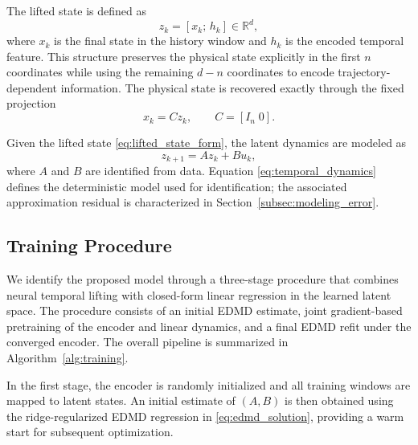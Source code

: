 \documentclass[journal]{IEEEtran}
\begin{document}
The lifted state is defined as
\begin{equation}
    z_k = [x_k;\,h_k] \in \mathbb{R}^{d},
    \label{eq:lifted_state_form}
\end{equation}
where $x_k$ is the final state in the history window and $h_k$ is the encoded temporal feature. This structure preserves the physical state explicitly in the first $n$ coordinates while using the remaining $d-n$ coordinates to encode trajectory-dependent information. The physical state is recovered exactly through the fixed projection
\begin{equation}
    x_k = C z_k, \qquad C = [I_n\;0].
    \label{eq:decoder_projection}
\end{equation}

Given the lifted state \eqref{eq:lifted_state_form}, the latent dynamics are modeled as
\begin{equation}
    z_{k+1} = A z_k + B u_k,
    \label{eq:temporal_dynamics}
\end{equation}
where $A$ and $B$ are identified from data. Equation \eqref{eq:temporal_dynamics} defines the deterministic model used for identification; the associated approximation residual is characterized in Section~\ref{subsec:modeling_error}.

\subsection{Training Procedure}
\label{sec:training}

We identify the proposed model through a three-stage procedure that combines neural temporal lifting with closed-form linear regression in the learned latent space. The procedure consists of an initial EDMD estimate, joint gradient-based pretraining of the encoder and linear dynamics, and a final EDMD refit under the converged encoder. The overall pipeline is summarized in Algorithm~\ref{alg:training}.

In the first stage, the encoder is randomly initialized and all training windows are mapped to latent states. An initial estimate of $(A,B)$ is then obtained using the ridge-regularized EDMD regression in \eqref{eq:edmd_solution}, providing a warm start for subsequent optimization.
\end{document}
